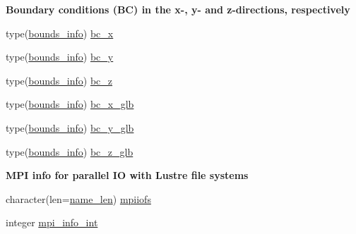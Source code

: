 \begin{Indent}\textbf{ Boundary conditions (BC) in the x-\/, y-\/ and z-\/directions, respectively}\par
\begin{DoxyCompactItemize}
\item 
type(\hyperlink{structm__derived__types_1_1bounds__info}{bounds\+\_\+info}) \hyperlink{namespacem__global__parameters_aa46a7f3638e49fa9ec33ea859b9e6a5a}{bc\+\_\+x}
\item 
type(\hyperlink{structm__derived__types_1_1bounds__info}{bounds\+\_\+info}) \hyperlink{namespacem__global__parameters_a68eaaca2982b39252417b29ef5d0f9c3}{bc\+\_\+y}
\item 
type(\hyperlink{structm__derived__types_1_1bounds__info}{bounds\+\_\+info}) \hyperlink{namespacem__global__parameters_a6769808569174ff0eef096e958889837}{bc\+\_\+z}
\item 
type(\hyperlink{structm__derived__types_1_1bounds__info}{bounds\+\_\+info}) \hyperlink{namespacem__global__parameters_a18f8ba3144b698c2753731b6e27fc581}{bc\+\_\+x\+\_\+glb}
\item 
type(\hyperlink{structm__derived__types_1_1bounds__info}{bounds\+\_\+info}) \hyperlink{namespacem__global__parameters_ac480f572058786c13c3e94efb6496a71}{bc\+\_\+y\+\_\+glb}
\item 
type(\hyperlink{structm__derived__types_1_1bounds__info}{bounds\+\_\+info}) \hyperlink{namespacem__global__parameters_aeb29c88b4fa96ec8edcfed6c42861280}{bc\+\_\+z\+\_\+glb}
\end{DoxyCompactItemize}
\end{Indent}
\begin{Indent}\textbf{ M\+PI info for parallel IO with Lustre file systems}\par
\begin{DoxyCompactItemize}
\item 
character(len=\hyperlink{namespacem__global__parameters_ac8252b115e717c6f1c8595be6f897df7}{name\+\_\+len}) \hyperlink{namespacem__global__parameters_ad4713c1e89eaa8fac3bb2181ba87b192}{mpiiofs}
\item 
integer \hyperlink{namespacem__global__parameters_a2663d07998d11d25e223cd7ad0bbd748}{mpi\+\_\+info\+\_\+int}
\end{DoxyCompactItemize}
\end{Indent}
